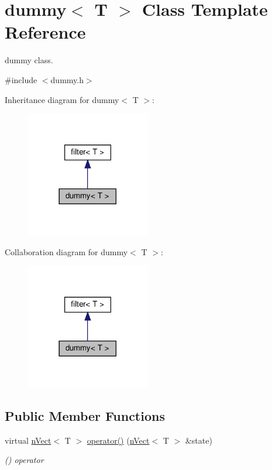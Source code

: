\hypertarget{classdummy}{}\section{dummy$<$ T $>$ Class Template Reference}
\label{classdummy}


dummy class.  




{\ttfamily \#include $<$dummy.\+h$>$}



Inheritance diagram for dummy$<$ T $>$\+:\nopagebreak
\begin{figure}[H]
\begin{center}
\leavevmode
\includegraphics[width=153pt]{classdummy__inherit__graph}
\end{center}
\end{figure}


Collaboration diagram for dummy$<$ T $>$\+:\nopagebreak
\begin{figure}[H]
\begin{center}
\leavevmode
\includegraphics[width=153pt]{classdummy__coll__graph}
\end{center}
\end{figure}
\subsection*{Public Member Functions}
\begin{DoxyCompactItemize}
\item 
virtual \hyperlink{classnVect}{n\+Vect}$<$ T $>$ \hyperlink{classdummy_a437aae6ce48cad80944cb578aa0c0218}{operator()} (\hyperlink{classnVect}{n\+Vect}$<$ T $>$ \&state)
\begin{DoxyCompactList}\small\item\em () operator \end{DoxyCompactList}\end{DoxyCompactItemize}


